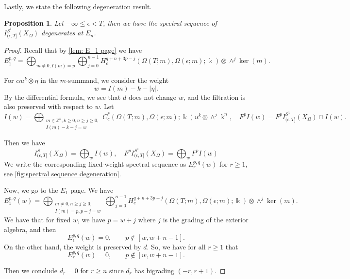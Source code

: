 \documentclass[11pt]{amsart}
\numberwithin{equation}{section}
\theoremstyle{plain}
\newtheorem{Prop}[prop]{Proposition}
\theoremstyle{definition}
\theoremstyle{remark}
\newcommand{\bZ} { {\mathbb{Z}}}
\begin{document}
Lastly, we state the following degeneration result.
\begin{Prop}\label{prop: degeneration of SS}Let $-\infty\leq \epsilon<T$, then we have the spectral sequence of $I_{(\epsilon,T]}^{S^1}(X_\Omega)$ degenerates at $E_n$.
\end{Prop}
\begin{proof}Recall that by \autoref{lem: E_1 page} we have
\[
    E_1^{p,q}=\bigoplus_{m\neq 0, I(m)= p} \bigoplus_{j=0}^{n-1}H^{q+n+3p-j}_c({\Omega(T;m)},{\Omega(\epsilon;m)} ;\Bbbk )   \otimes \wedge^j \ker(m).
\]

For $\alpha u^k \otimes \eta$ in the $m$-summand, we consider the weight
\[w=I(m)-k-|\eta|.\]
By the differential formula, we see that $d$ does not change $w$, and the filtration is also preserved with respect to $w$. Let
\[I(w)=\bigoplus_{\substack{m\in \bZ^n,k\geq 0,n\geq j\geq 0,\\I(m)-k-j=w}}C_c^*({\Omega(T;m)},{\Omega(\epsilon;m)} ;\Bbbk )  u^k \otimes\wedge^j\Bbbk^n,\quad F^pI(w)=F^pI_{(\epsilon,T]}^{S^1}(X_\Omega)\cap I(w).\]



Then we have
\[I_{(\epsilon,T]}^{S^1}(X_\Omega)=\bigoplus_w I(w),\quad F^pI_{(\epsilon,T]}^{S^1}(X_\Omega) =\bigoplus_w F^pI(w)\]
We write the corresponding fixed-weight spectral sequence as $E_r^{p,q}(w)$ for $r\geq 1$, see \autoref{fig:spectral sequence degeneration}. 

Now, we go to the $E_1$ page. We have
\[E_1^{p,q}(w) = \bigoplus_{\substack{m\neq 0,n\geq j\geq 0,\\I(m)=p,p-j=w}} \bigoplus_{j=0}^{n-1}H_c^{q+n+3p-j}(\Omega(T;m),\Omega(\epsilon; m); \Bbbk) \otimes \wedge^j \ker(m).\]
We have that for fixed $w$, we have $p=w+j$ where $j$ is the grading of the exterior algebra, and then
\[ E_1^{p,q}(w)=0,\qquad p\notin[w,w+n-1].
\]
On the other hand, the weight is preserved by $d$. So, we have for all $r\geq 1$ that
\[ E_r^{p,q}(w)=0,\qquad p\notin[w,w+n-1].
\]

Then we conclude $d_r=0$ for $r\geq n$ since $d_r$ has bigrading $(-r,r+1)$.    
\end{proof}
\end{document}
